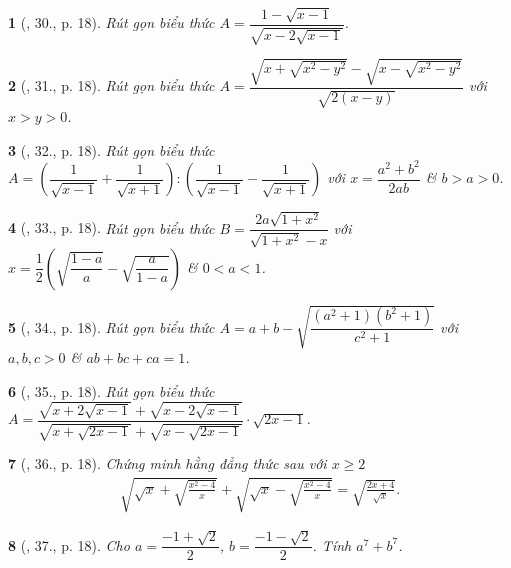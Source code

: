\documentclass{article}
\newtheorem{baitoan}{}%
\begin{document}
\begin{baitoan}[\cite{Binh_Toan_9_tap_1}, 30., p. 18]
	Rút gọn biểu thức $A = \dfrac{1 - \sqrt{x - 1}}{\sqrt{x - 2\sqrt{x - 1}}}$.
\end{baitoan}

\begin{baitoan}[\cite{Binh_Toan_9_tap_1}, 31., p. 18]
	Rút gọn biểu thức $A = \dfrac{\sqrt{x + \sqrt{x^2 - y^2}} - \sqrt{x - \sqrt{x^2 - y^2}}}{\sqrt{2(x - y)}}$ với $x > y > 0$.
\end{baitoan}

\begin{baitoan}[\cite{Binh_Toan_9_tap_1}, 32., p. 18]
	Rút gọn biểu thức $A = \left(\dfrac{1}{\sqrt{x - 1}} + \dfrac{1}{\sqrt{x + 1}}\right):\left(\dfrac{1}{\sqrt{x - 1}} - \dfrac{1}{\sqrt{x + 1}}\right)$ với $x = \dfrac{a^2 + b^2}{2ab}$ \& $b > a > 0$.
\end{baitoan}

\begin{baitoan}[\cite{Binh_Toan_9_tap_1}, 33., p. 18]
	Rút gọn biểu thức $B = \dfrac{2a\sqrt{1 + x^2}}{\sqrt{1 + x^2} - x}$ với $x = \dfrac{1}{2}\left(\sqrt{\dfrac{1 - a}{a}} - \sqrt{\dfrac{a}{1 - a}}\right)$ \& $0 < a < 1$.
\end{baitoan}

\begin{baitoan}[\cite{Binh_Toan_9_tap_1}, 34., p. 18]
	Rút gọn biểu thức $A = a + b - \sqrt{\dfrac{(a^2 + 1)(b^2 + 1)}{c^2 + 1}}$ với $a,b,c > 0$ \& $ab + bc + ca = 1$.
\end{baitoan}

\begin{baitoan}[\cite{Binh_Toan_9_tap_1}, 35., p. 18]
	Rút gọn biểu thức $A = \dfrac{\sqrt{x + 2\sqrt{x - 1}} + \sqrt{x - 2\sqrt{x - 1}}}{\sqrt{x + \sqrt{2x - 1}} + \sqrt{x - \sqrt{2x - 1}}}\cdot\sqrt{2x - 1}$.
\end{baitoan}

\begin{baitoan}[\cite{Binh_Toan_9_tap_1}, 36., p. 18]
	Chứng minh hằng đẳng thức sau với $x\ge2$
	\begin{align*}
		\sqrt{\sqrt{x} + \sqrt{\frac{x^2 - 4}{x}}} + \sqrt{\sqrt{x} - \sqrt{\frac{x^2 - 4}{x}}} = \sqrt{\frac{2x + 4}{\sqrt{x}}}.
	\end{align*}
\end{baitoan}

\begin{baitoan}[\cite{Binh_Toan_9_tap_1}, 37., p. 18]
	Cho $a = \dfrac{-1 + \sqrt{2}}{2}$, $b = \dfrac{-1 - \sqrt{2}}{2}$. Tính $a^7 + b^7$.
\end{baitoan}
\end{document}
